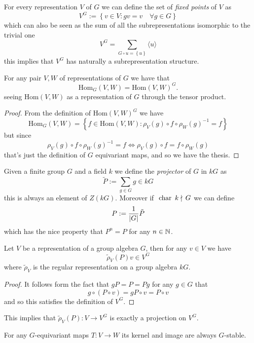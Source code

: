 \documentclass[11pt]{scrartcl}
\begin{document}
	\begin{definition}
		For every representation $V$ of $G$ we can define the set of \textit{fixed points} of $V$ as 
		$$V^G:=\left\{v\in V:gv=v\quad \forall g\in G\right\}$$
		which can also be seen as the sum of all the subrepresentations isomorphic to the trivial one
		$$V^G=\sum_{G\circ u = \left\{u\right\}}\langle u \rangle$$
		this implies that $V^G$ has naturally a subrepresentation structure.
	\end{definition}
	\begin{lemma}
		For any pair $V,W$ of representations of $G$ we have that
		$$\text{Hom}_G(V,W)=\text{Hom}(V,W)^G.$$
		seeing $\text{Hom}(V,W)$ as a representation of $G$ through the tensor product.
	\end{lemma}
	\begin{proof}
		From the definition of $\text{Hom}(V,W)^G$ we have
		$$\text{Hom}_G(V,W)=\left\{f\in \text{Hom}(V,W):\rho_V(g)\circ f \circ \rho_W(g)^{-1}=f\right\}$$
		but since 
		$$\rho_V(g)\circ f \circ \rho_W(g)^{-1}=f \iff \rho_V(g)\circ f =f\circ \rho_W(g)$$
		that's just the definition of $G$ equivariant maps, and so we have the thesis.
	\end{proof}
	\begin{definition}[Projector]
		Given a finite group $G$ and a field $k$ we define the \textit{projector} of $G$ in $kG$ as  
		$$\tilde{P}:=\sum_{g\in G}g\in kG$$
		this is always an element of $Z(kG)$. Moreover if $\text{ char }\,k\nmid \,G$ we can define 
		$$P:=\frac{1}{\left\lvert G \right\rvert}\tilde{P}$$
		which has the nice property that $P^n=P$ for any $n\in\mathbb N$.
	\end{definition}
	\begin{lemma}[Projection to $V^G$]
		Let $V$ be a representation of a group algebra $G$, then for any $v\in V$ we have
		$$\tilde{\rho}_V(P)v\in V^G$$
		where $\tilde{\rho}_V$ is the regular representation on a group algebra $kG$.
	\end{lemma}
	\begin{proof}
		It follows form the fact that $gP=P=Pg$ for any $g\in G$ that
		$$g\circ\left( P \circ v\right) = gP\circ v = P\circ v$$
		and so this satisfies the definition of $V^G$.
	\end{proof}
	This implies that $\tilde{\rho}_V(P):V\to V^G$ is exactly a projection on $V^G$.
	\begin{lemma}
		For any $G$-equivariant maps $T:V\to W$ its kernel and image are always $G$-stable.
	\end{lemma}
\end{document}
